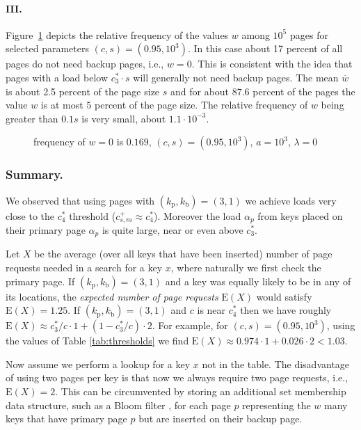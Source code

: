 \let\accentvec\vec \documentclass{llncs}
\newcommand{\fr}{\lambda}
\newcommand{\npm}{\alpha_p}
\newcommand{\kprim}{{k_{\mathrm{p}}}}
\newcommand{\kback}{{k_{\mathrm{b}}}}
\newcommand{\wb}{w}
\newcommand{\Ewb}{\overline{w}}
\newcommand{\tb}{{c^{\scriptscriptstyle+}_{s,m}}}
\newcommand{\ie}{i.e.}
\newcommand{\imgScale}{0.58}
\newcommand{\figPath}{.}
\begin{document}
\paragraph{III.}
Figure~\ref{fig:moved_keys_per_page} depicts the relative frequency of the values $\wb$ among $10^5$ pages for selected parameters $(c,s)=(0.95,10^3)$. In this case about 17 percent of all pages do not need backup pages, \ie, $w=0$. This is consistent with the idea that pages with a load below $c^*_3 \cdot s$ will generally not need backup pages. The mean $\Ewb$ is about 2.5 percent of the page size $s$ and for about $87.6$ percent of the pages the value $\wb$ is at most $5$ percent of the page size. The relative frequency of $\wb$ being greater than $0.1s$ is very small, about $1.1\cdot 10^{-3}$.
\begin{figure}
\centering
\scalebox{\imgScale}{}
\vspace{-0.1cm}
\caption{\label{fig:moved_keys_per_page}frequency of $\wb=0$ is $0.169$, $(c,s)=(0.95,10^3)$, $a=10^3$, $\fr=0$}
\end{figure}
 
\subsubsection{Summary.}
\label{sec:page_request}
We observed that using pages with $(\kprim,\kback)=(3,1)$ we achieve loads very close to the $c^*_4$ threshold ($\tb\approx c^*_4$).
Moreover the load $\npm$ from keys placed on their primary page $\npm$ is quite large, near or even
above $c^*_3$.

Let $X$ be the average (over all keys that have been inserted) number of page requests needed in a search for a key $x$,
where naturally we first check the primary page.
If $(\kprim,\kback)=(3,1)$ and a key was equally likely to be in any of its locations, 
the \emph{expected number of page requests} $\mathrm{E}(X)$ would satisfy $\mathrm{E}(X)=1.25$.
If $(\kprim,\kback)=(3,1)$ and $c$ is near $c^*_4$ then we have roughly $\mathrm{E}(X)\approx c^*_3/c \cdot 1 + (1-c^*_3/c) \cdot 2$.
For example, for $(c,s)=(0.95,10^3)$, using the values of Table \ref{tab:thresholds} we find $\mathrm{E}(X)\approx 0.974 \cdot 1 +  0.026\cdot 2<1.03$.



Now assume we perform a lookup for a key $x$ not in the table. The
disadvantage of using two pages per key is that now we always require two
page requests, \ie, $\mathrm{E}(X)=2$. This can be circumvented by
storing an additional set membership data structure, such as a Bloom
filter \cite{Bloom1970}, for each page $p$ representing the $\wb$ many
keys that have primary page $p$ but are inserted on their backup page.
\end{document}
